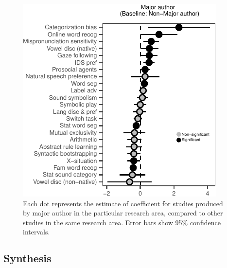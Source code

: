 \documentclass[10pt, letterpaper]{article}
\newenvironment{CodeChunk}{}{}
\begin{document}
\begin{CodeChunk}
\begin{figure}[t!]

{\centering \includegraphics{figs/image-1} 

}

\caption[Each dot represents the estimate of coefficient for studies produced by major author in the particular research area, compared to other studies in the same research area]{Each dot represents the estimate of coefficient for studies produced by major author in the particular research area, compared to other studies in the same research area. Error bars show 95\% confidence intervals. }\label{fig:image}
\end{figure}
\end{CodeChunk}

\hypertarget{synthesis}{%
\subsection{Synthesis}\label{synthesis}}
\end{document}
